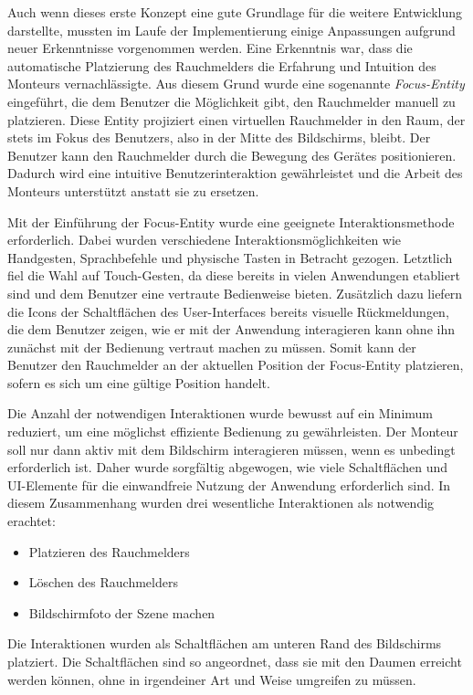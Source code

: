 Auch wenn dieses erste Konzept eine gute Grundlage für die weitere Entwicklung darstellte, mussten im Laufe der Implementierung einige Anpassungen aufgrund neuer Erkenntnisse vorgenommen werden. Eine Erkenntnis war, dass die automatische Platzierung des Rauchmelders die Erfahrung und Intuition des Monteurs vernachlässigte. Aus diesem Grund wurde eine sogenannte \textit{Focus-Entity} eingeführt, die dem Benutzer die Möglichkeit gibt, den Rauchmelder manuell zu platzieren. Diese Entity projiziert einen virtuellen Rauchmelder in den Raum, der stets im Fokus des Benutzers, also in der Mitte des Bildschirms, bleibt. Der Benutzer kann den Rauchmelder durch die Bewegung des Gerätes positionieren. Dadurch wird eine intuitive Benutzerinteraktion gewährleistet und die Arbeit des Monteurs unterstützt anstatt sie zu ersetzen.

Mit der Einführung der Focus-Entity wurde eine geeignete Interaktionsmethode erforderlich. Dabei wurden verschiedene Interaktionsmöglichkeiten wie Handgesten, Sprachbefehle und physische Tasten in Betracht gezogen. Letztlich fiel die Wahl auf Touch-Gesten, da diese bereits in vielen Anwendungen etabliert sind und dem Benutzer eine vertraute Bedienweise bieten. Zusätzlich dazu liefern die Icons der Schaltflächen des User-Interfaces bereits visuelle Rückmeldungen, die dem Benutzer zeigen, wie er mit der Anwendung interagieren kann ohne ihn zunächst mit der Bedienung vertraut machen zu müssen. Somit kann der Benutzer den Rauchmelder an der aktuellen Position der Focus-Entity platzieren, sofern es sich um eine gültige Position handelt.

Die Anzahl der notwendigen Interaktionen wurde bewusst auf ein Minimum reduziert, um eine möglichst effiziente Bedienung zu gewährleisten. Der Monteur soll nur dann aktiv mit dem Bildschirm interagieren müssen, wenn es unbedingt erforderlich ist. Daher wurde sorgfältig abgewogen, wie viele Schaltflächen und UI-Elemente für die einwandfreie Nutzung der Anwendung erforderlich sind. In diesem Zusammenhang wurden drei wesentliche Interaktionen als notwendig erachtet:

\begin{itemize}
    \item Platzieren des Rauchmelders
    \item Löschen des Rauchmelders
    \item Bildschirmfoto der Szene machen
\end{itemize}

Die Interaktionen wurden als Schaltflächen am unteren Rand des Bildschirms platziert. Die Schaltflächen sind so angeordnet, dass sie mit den Daumen erreicht werden können, ohne in irgendeiner Art und Weise umgreifen zu müssen. 

